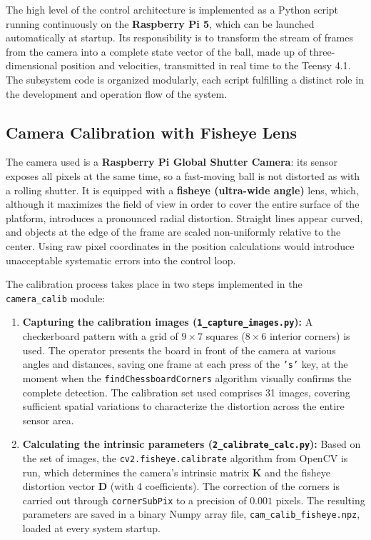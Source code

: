 \documentclass[12pt,a4paper]{report}
\begin{document}
The high level of the control architecture is implemented as a Python script running continuously on the \textbf{Raspberry Pi 5}, which can be launched automatically at startup. Its responsibility is to transform the stream of frames from the camera into a complete state vector of the ball, made up of three-dimensional position and velocities, transmitted in real time to the Teensy 4.1. The subsystem code is organized modularly, each script fulfilling a distinct role in the development and operation flow of the system.

\subsection{Camera Calibration with Fisheye Lens}

The camera used is a \textbf{Raspberry Pi Global Shutter Camera}: its sensor exposes all pixels at the same time, so a fast-moving ball is not distorted as with a rolling shutter. It is equipped with a \textbf{fisheye (ultra-wide angle)} lens, which, although it maximizes the field of view in order to cover the entire surface of the platform, introduces a pronounced radial distortion. Straight lines appear curved, and objects at the edge of the frame are scaled non-uniformly relative to the center. Using raw pixel coordinates in the position calculations would introduce unacceptable systematic errors into the control loop.

The calibration process takes place in two steps implemented in the \texttt{camera\_calib} module:

\begin{enumerate}
    \item \textbf{Capturing the calibration images (\texttt{1\_capture\_images.py}):} A checkerboard pattern with a grid of $9 \times 7$ squares ($8 \times 6$ interior corners) is used. The operator presents the board in front of the camera at various angles and distances, saving one frame at each press of the \texttt{'s'} key, at the moment when the \texttt{findChessboardCorners} algorithm \cite{chessboard_corners} visually confirms the complete detection. The calibration set used comprises 31 images, covering sufficient spatial variations to characterize the distortion across the entire sensor area.

    \item \textbf{Calculating the intrinsic parameters (\texttt{2\_calibrate\_calc.py}):} Based on the set of images, the \texttt{cv2.fisheye.calibrate} algorithm from OpenCV \cite{opencv_calib} is run, which determines the camera's intrinsic matrix $\mathbf{K}$ and the fisheye distortion vector \cite{fisheye_calib, opencv_remap} $\mathbf{D}$ (with 4 coefficients). The correction of the corners is carried out through \texttt{cornerSubPix} to a precision of $0.001$ pixels. The resulting parameters are saved in a binary Numpy array file, \texttt{cam\_calib\_fisheye.npz}, loaded at every system startup.
\end{enumerate}
\end{document}
